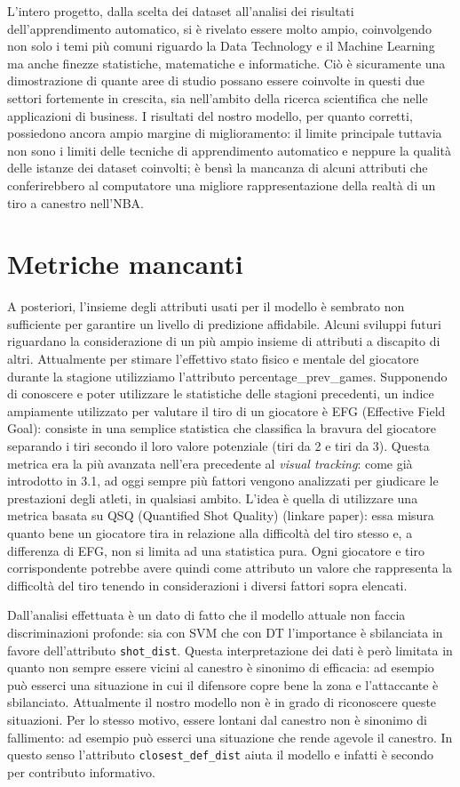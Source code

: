 L'intero progetto, dalla scelta dei dataset all'analisi dei risultati dell'apprendimento automatico, si è rivelato essere molto ampio, coinvolgendo non solo i temi più comuni riguardo la Data Technology e il Machine Learning ma anche finezze statistiche, matematiche e informatiche. Ciò è sicuramente una dimostrazione di quante aree di studio possano essere coinvolte in questi due settori fortemente in crescita, sia nell'ambito della ricerca scientifica che nelle applicazioni di business.
I risultati del nostro modello, per quanto corretti, possiedono ancora ampio margine di miglioramento: il limite principale tuttavia non sono i limiti delle tecniche di apprendimento automatico e neppure la qualità delle istanze dei dataset coinvolti; è bensì la mancanza di alcuni attributi che conferirebbero al computatore una migliore rappresentazione della realtà di un tiro a canestro nell'NBA.

\section{Metriche mancanti}
A posteriori, l'insieme degli attributi usati per il modello è sembrato non sufficiente per garantire un livello di predizione affidabile.
Alcuni sviluppi futuri riguardano la considerazione di un più ampio insieme di attributi a discapito di altri.
Attualmente per stimare l'effettivo stato fisico e mentale del giocatore durante la stagione utilizziamo l'attributo percentage\_prev\_games. Supponendo di conoscere e poter utilizzare le statistiche delle stagioni precedenti, un indice ampiamente utilizzato per valutare il tiro di un giocatore è EFG (Effective Field Goal): consiste in una semplice statistica che classifica la bravura del giocatore separando i tiri secondo il loro valore potenziale (tiri da 2 e tiri da 3).
Questa metrica era la più avanzata nell'era precedente al \textit{visual tracking}: come già introdotto in 3.1, ad oggi sempre più fattori vengono analizzati per giudicare le prestazioni degli atleti, in qualsiasi ambito.
L'idea è quella di utilizzare una metrica basata su QSQ (Quantified Shot Quality) (linkare paper): essa misura quanto bene un giocatore tira in relazione alla difficoltà del tiro stesso e, a differenza di EFG, non si limita ad una statistica pura.
Ogni giocatore e tiro corrispondente potrebbe avere quindi come attributo un valore che rappresenta la difficoltà del tiro tenendo in considerazioni i diversi fattori sopra elencati.

Dall'analisi effettuata è un dato di fatto che il modello attuale non faccia discriminazioni profonde: sia con SVM che con DT l'importance è sbilanciata in favore dell'attributo \texttt{shot\_dist}. 
Questa interpretazione dei dati è però limitata in quanto non sempre essere vicini al canestro è sinonimo di efficacia: ad esempio può esserci una situazione in cui il difensore copre bene la zona e l'attaccante è sbilanciato. Attualmente il nostro modello non è in grado di riconoscere queste situazioni. Per lo stesso motivo, essere lontani dal canestro non è sinonimo di fallimento: ad esempio può esserci una situazione che rende agevole il canestro.
In questo senso l'attributo \texttt{closest\_def\_dist} aiuta il modello e infatti è secondo per contributo informativo.

